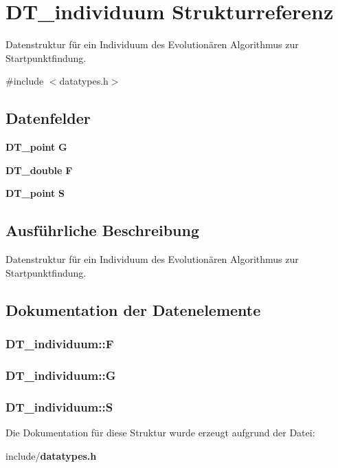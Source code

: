 \section{DT\_\-individuum Strukturreferenz}
\label{struct_d_t__individuum}


Datenstruktur für ein Individuum des Evolutionären Algorithmus zur Startpunktfindung.  




{\ttfamily \#include $<$datatypes.h$>$}

\subsection*{Datenfelder}
\begin{DoxyCompactItemize}
\item 
{\bf DT\_\-point} {\bf G}
\item 
{\bf DT\_\-double} {\bf F}
\item 
{\bf DT\_\-point} {\bf S}
\end{DoxyCompactItemize}


\subsection{Ausführliche Beschreibung}
Datenstruktur für ein Individuum des Evolutionären Algorithmus zur Startpunktfindung. 

\subsection{Dokumentation der Datenelemente}
\subsubsection[{F}]{ {\bf DT\_\-individuum::F}}\label{struct_d_t__individuum_a2584a542d777460ea513a4b1e06652d5}
\subsubsection[{G}]{ {\bf DT\_\-individuum::G}}\label{struct_d_t__individuum_ab6095c97050953a86a09bc27aef6ef03}
\subsubsection[{S}]{ {\bf DT\_\-individuum::S}}\label{struct_d_t__individuum_af384b4ffaf7c42e9c7f0537fc0ccfff0}


Die Dokumentation für diese Struktur wurde erzeugt aufgrund der Datei:\begin{DoxyCompactItemize}
\item 
include/{\bf datatypes.h}\end{DoxyCompactItemize}
